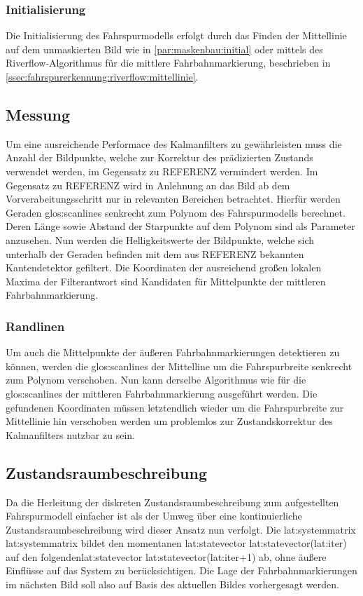 \subsubsection{Initialisierung} 
\label{sssec:fahrspurerkennung:kalman:fahrspurmodell:initialisierung}
 Die Initialisierung des Fahrspurmodells erfolgt durch das Finden der Mittellinie auf dem unmaskierten Bild wie in \ref{par:maskenbau:initial} oder mittels des Riverflow-Algorithmus für die mittlere Fahrbahnmarkierung, beschrieben in \ref{ssec:fahrspurerkennung:riverflow:mittellinie}.
 
\subsection{Messung} \label{ssec:fahrspurerkennung:kalman:messung}
Um eine ausreichende Performace des Kalmanfilters zu gewährleisten muss die Anzahl der Bildpunkte, welche zur Korrektur des prädizierten Zustands verwendet werden, im Gegensatz zu REFERENZ vermindert werden. Im Gegensatz zu REFERENZ wird in Anlehnung an \autocite{risackRobustLaneRecognition} das Bild ab dem Vorverabeitungsschritt nur in relevanten Bereichen betrachtet.
Hierfür werden Geraden \flq \glspl{glos:scanline} \frq senkrecht zum Polynom des Fahrspurmodells berechnet. Deren Länge sowie Abstand der Starpunkte auf dem Polynom sind als Parameter anzusehen. Nun werden die Helligkeitswerte der Bildpunkte, welche sich unterhalb der Geraden befinden mit dem aus REFERENZ bekannten Kantendetektor gefiltert. Die Koordinaten der ausreichend großen lokalen Maxima der Filterantwort sind Kandidaten für Mittelpunkte der mittleren Fahrbahnmarkierung.
\subsubsection{Randlinen}
Um auch die Mittelpunkte der äußeren Fahrbahnmarkierungen detektieren zu können, werden die \glspl{glos:scanline} der Mittelline um die Fahrspurbreite senkrecht zum Polynom verschoben. Nun kann derselbe Algorithmus wie für die \glspl{glos:scanline} der mittleren Fahrbahnmarkierung ausgeführt werden. Die gefundenen Koordinaten müssen letztendlich wieder um die Fahrspurbreite zur Mittellinie hin verschoben werden um problemlos zur Zustandskorrektur des Kalmanfilters nutzbar zu sein.
 
\subsection{Zustandsraumbeschreibung}
Da die Herleitung der diskreten Zustandsraumbeschreibung zum aufgestellten Fahrspurmodell einfacher ist als der Umweg über eine kontinuierliche Zustandsraumbeschreibung  wird dieser Ansatz nun verfolgt.
Die \glsdesc{lat:systemmatrix} \gls{lat:systemmatrix} bildet den momentanen \glsdesc{lat:statevector} \gls{lat:statevector}(\gls{lat:iter}) auf den folgenden\glsdesc{lat:statevector} \gls{lat:statevector}(\gls{lat:iter}+1) ab, ohne äußere Einflüsse auf das System zu berücksichtigen. Die Lage der Fahrbahnmarkierungen im nächsten Bild soll also auf Basis des aktuellen Bildes vorhergesagt werden.

